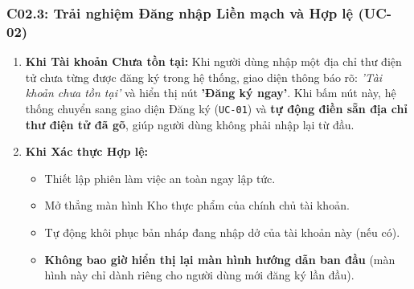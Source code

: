 \documentclass[10pt,a4paper]{article}
\begin{document}
\subsubsection{C02.3: Trải nghiệm Đăng nhập Liền mạch và Hợp lệ (UC-02)}
\begin{enumerate}[itemsep=2pt]
    \item \textbf{Khi Tài khoản Chưa tồn tại:} Khi người dùng nhập một địa chỉ thư điện tử chưa từng được đăng ký trong hệ thống, giao diện thông báo rõ: \textit{'Tài khoản chưa tồn tại'} và hiển thị nút \textbf{'Đăng ký ngay'}. Khi bấm nút này, hệ thống chuyển sang giao diện Đăng ký (\texttt{UC-01}) và \textbf{tự động điền sẵn địa chỉ thư điện tử đã gõ}, giúp người dùng không phải nhập lại từ đầu.
    \item \textbf{Khi Xác thực Hợp lệ:}
    \begin{itemize}
        \item Thiết lập phiên làm việc an toàn ngay lập tức.
        \item Mở thẳng màn hình Kho thực phẩm của chính chủ tài khoản.
        \item Tự động khôi phục bản nháp đang nhập dở của tài khoản này (nếu có).
        \item \textbf{Không bao giờ hiển thị lại màn hình hướng dẫn ban đầu} (màn hình này chỉ dành riêng cho người dùng mới đăng ký lần đầu).
    \end{itemize}
\end{enumerate}
\end{document}
